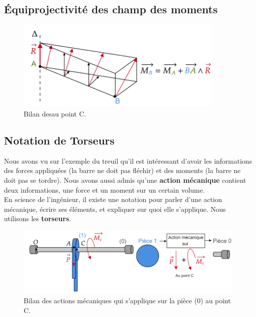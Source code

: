 \documentclass[
	11pt, %
	fleqn, %
	a4paper, %
]{LegrandOrangeBook}
\begin{document}
\subsection{Équiprojectivité des champ des moments}


\begin{figure}[H]  %
	\centering %
	\includegraphics[width=0.9\textwidth]{Images/equi1.png} %
    \caption{Bilan desau point C.}
	\label{equi1} %
\end{figure}


\subsection{Notation de Torseurs}
Nous avons vu sur l'exemple du treuil qu'il est intéressant d'avoir les informations des forces appliquées (la barre ne doit pas fléchir) et des moments (la barre ne doit pas se tordre). Nous avons aussi admis qu'une \textbf{action mécanique} contient deux informations, une force et un moment sur un certain volume.\\
En science de l'ingénieur, il existe une notation pour parler d'une action mécanique, écrire ses éléments, et expliquer sur quoi elle s'applique. Nous utilisons les \textbf{torseurs}.


\begin{figure}[H]  %
	\centering %
	\includegraphics[width=1\textwidth]{Images/treuil3.png} %
    \caption{Bilan des actions mécaniques qui s'applique sur la pièce (0) au point C.}
	\label{treuil3} %
\end{figure}
\end{document}
